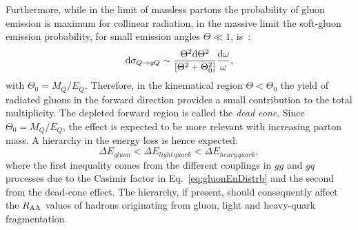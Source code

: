 Furthermore, while in the limit of massless partons the probability of 
gluon emission is maximum for collinear radiation,
in the massive limit the soft-gluon emission probability, for small 
emission angles $\Theta \ll 1$, is~\cite{Dokshitzer:1991fd}:
\begin{equation}
\label{eq:DeadCone}
{\rm d} \sigma_{Q \rightarrow gQ } \sim \frac{\Theta^2 {\rm d} \Theta^2}{[\Theta^2+ \Theta^2_0]} \frac{{\rm d} \omega}{\omega},
\end{equation}
with $\Theta_0 = M_Q/E_Q$.
Therefore, in the kinematical region $\Theta < \Theta_0$ the yield of radiated gluons
in the forward direction provides a small contribution to the total multiplicity. 
The depleted forward region is called the {\it dead cone}.
Since $\Theta_0 = M_Q/E_Q$, the effect is expected to be more 
relevant with increasing parton mass. A hierarchy in 
the energy loss is hence expected:
\begin{equation}
\label{eq:HierachyRaa}
\Delta E_{gluon} < \Delta E_{light\, quark} < \Delta E_{heavy\, quark},
\end{equation}
where the first inequality comes from the different couplings in $gg$ and $gq$ 
processes due to the Casimir factor in Eq.~\ref{eq:gluonEnDistrb} 
and the second from the dead-cone effect. The hierarchy, if present, 
should consequently affect the $R_{\rm AA}$ values of hadrons originating from
gluon, light and heavy-quark fragmentation.\\



